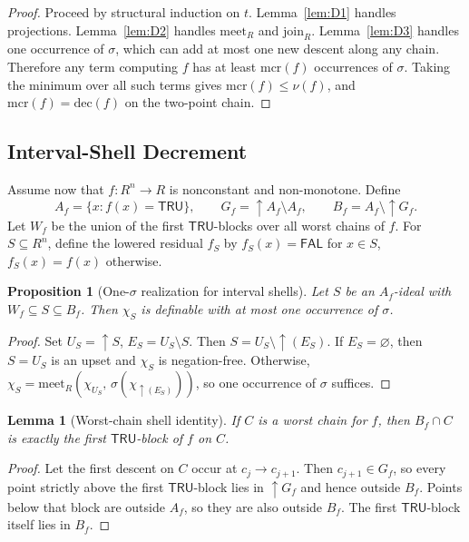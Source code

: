 \documentclass[11pt]{article}
\newtheorem{lemma}{Lemma}
\newtheorem{proposition}{Proposition}
\theoremstyle{remark}
\newcommand{\FAL}{\ensuremath{\mathsf{FAL}}}
\newcommand{\TRU}{\ensuremath{\mathsf{TRU}}}
\newcommand{\meetR}{\ensuremath{\mathrm{meet}_R}}
\newcommand{\joinR}{\ensuremath{\mathrm{join}_R}}
\newcommand{\mcr}{\ensuremath{\mathrm{mcr}}}
\newcommand{\dec}{\ensuremath{\mathrm{dec}}}
\begin{document}
\begin{proof}
Proceed by structural induction on $t$. Lemma~\ref{lem:D1} handles
projections. Lemma~\ref{lem:D2} handles $\meetR$ and $\joinR$.
Lemma~\ref{lem:D3} handles one occurrence of $\sigma$, which can add at
most one new descent along any chain. Therefore any term computing $f$ has
at least $\mcr(f)$ occurrences of $\sigma$. Taking the minimum over all
such terms gives $\mcr(f)\le\nu(f)$, and $\mcr(f)=\dec(f)$ on the two-point
chain.
\end{proof}

\subsection{Interval-Shell Decrement}

Assume now that $f:R^n\to R$ is nonconstant and non-monotone. Define
\[
A_f=\{x: f(x)=\TRU\},\qquad
G_f={\uparrow}A_f\setminus A_f,\qquad
B_f=A_f\setminus{\uparrow}G_f.
\]
Let $W_f$ be the union of the first $\TRU$-blocks over all worst chains of
$f$. For $S\subseteq R^n$, define the lowered residual $f_S$ by
$f_S(x)=\FAL$ for $x\in S$, $f_S(x)=f(x)$ otherwise.

\begin{proposition}[One-$\sigma$ realization for interval shells]
\label{prop:D5}
Let $S$ be an $A_f$-ideal with $W_f\subseteq S\subseteq B_f$. Then $\chi_S$
is definable with at most one occurrence of $\sigma$.
\end{proposition}

\begin{proof}
Set $U_S={\uparrow}S$, $E_S=U_S\setminus S$. Then
$S=U_S\setminus{\uparrow}(E_S)$. If $E_S=\varnothing$, then $S=U_S$ is an
upset and $\chi_S$ is negation-free. Otherwise,
$\chi_S=\meetR(\chi_{U_S},\,\sigma(\chi_{{\uparrow}(E_S)}))$, so one
occurrence of $\sigma$ suffices.
\end{proof}

\begin{lemma}[Worst-chain shell identity]\label{lem:D6}
If $C$ is a worst chain for $f$, then $B_f\cap C$ is exactly the first
$\TRU$-block of $f$ on $C$.
\end{lemma}

\begin{proof}
Let the first descent on $C$ occur at $c_j\to c_{j+1}$. Then
$c_{j+1}\in G_f$, so every point strictly above the first $\TRU$-block lies
in ${\uparrow}G_f$ and hence outside $B_f$. Points below that block are
outside $A_f$, so they are also outside $B_f$. The first $\TRU$-block
itself lies in $B_f$.
\end{proof}
\end{document}
